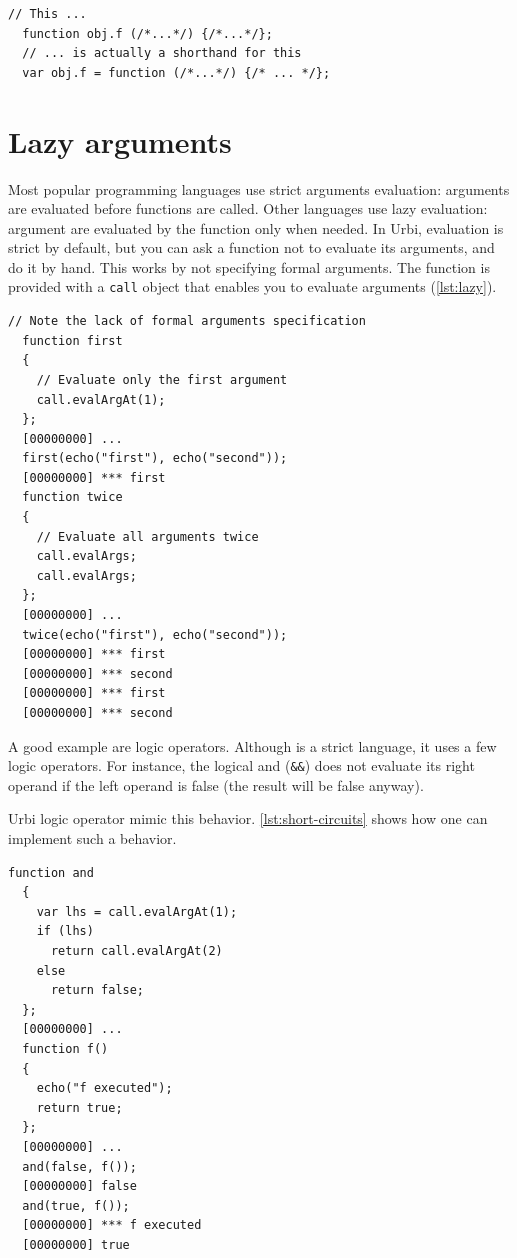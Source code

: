 \documentclass[openright,twoside,12pt]{report}
\newcommand{\urbi}{Urbi\xspace}
\newcommand{\lst}[1]{\autoref{lst:#1}}
\begin{document}
\begin{lstlisting}[caption=The function sugar,
  label=lst:function-sugar]
  // This ...
  function obj.f (/*...*/) {/*...*/};
  // ... is actually a shorthand for this
  var obj.f = function (/*...*/) {/* ... */};
\end{lstlisting}

\section{Lazy arguments}

Most popular programming languages use strict arguments evaluation:
arguments are evaluated before functions are called. Other languages
use lazy evaluation: argument are evaluated by the function only when
needed. In \urbi, evaluation is strict by default, but you can ask a
function not to evaluate its arguments, and do it by hand. This works
by not specifying formal arguments. The function is provided with a
\texttt{call} object that enables you to evaluate arguments
(\lst{lazy}).

\begin{lstlisting}[caption=Tweaking arguments evaluation,
  label=lst:lazy]
  // Note the lack of formal arguments specification
  function first
  {
    // Evaluate only the first argument
    call.evalArgAt(1);
  };
  [00000000] ...
  first(echo("first"), echo("second"));
  [00000000] *** first
  function twice
  {
    // Evaluate all arguments twice
    call.evalArgs;
    call.evalArgs;
  };
  [00000000] ...
  twice(echo("first"), echo("second"));
  [00000000] *** first
  [00000000] *** second
  [00000000] *** first
  [00000000] *** second
\end{lstlisting}

A good example are logic operators. Although \Cxx is a strict
language, it uses a few logic operators. For instance, the logical and
(\texttt{\&\&}) does not evaluate its right operand if the left
operand is false (the result will be false anyway).

\urbi logic operator mimic this behavior. \lst{short-circuits} shows
how one can implement such a behavior.

\begin{lstlisting}[caption=Implementing logic short circuits,
  label=lst:short-circuits]
  function and
  {
    var lhs = call.evalArgAt(1);
    if (lhs)
      return call.evalArgAt(2)
    else
      return false;
  };
  [00000000] ...
  function f()
  {
    echo("f executed");
    return true;
  };
  [00000000] ...
  and(false, f());
  [00000000] false
  and(true, f());
  [00000000] *** f executed
  [00000000] true
\end{lstlisting}
\end{document}

